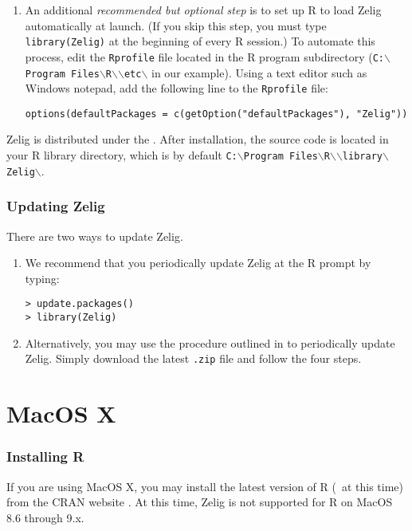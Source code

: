 \begin{enumerate}
\item An additional \emph{recommended but optional step} is to set up
  R to load Zelig automatically at launch.  (If you skip this step,
  you must type {\tt library(Zelig)} at the beginning of every R
  session.)  To automate this process, edit the {\tt Rprofile} file
  located in the R program subdirectory ({\tt C:$\backslash$Program
    Files$\backslash$R$\backslash$\rwvers$\backslash$etc$\backslash$}
  in our example).  Using a text editor such as Windows notepad, add
  the following line to the {\tt Rprofile} file:
\begin{verbatim}
options(defaultPackages = c(getOption("defaultPackages"), "Zelig"))
\end{verbatim}
\end{enumerate}

Zelig is distributed under the .  After
installation, the source code is located in your R library directory,
which is by default {\tt C:$\backslash$Program
  Files$\backslash$R$\backslash$\rwvers$\backslash$library$\backslash$Zelig$\backslash$}.

\subsubsection{Updating Zelig}

There are two ways to update Zelig.
\begin{enumerate}
\item We recommend that you periodically update Zelig at the R prompt
  by typing:
\begin{verbatim}
> update.packages()
> library(Zelig)
\end{verbatim}
\item Alternatively, you may use the procedure outlined in
   to periodically update Zelig.  Simply download the
  latest {\tt .zip} file and follow the four steps.
\end{enumerate}

\section{MacOS X}\label{ss:osx}

\subsubsection{Installing R}  

If you are using MacOS X, you may install the latest version of R
(\fullrvers\ at this time) from the CRAN website .
At this time, Zelig is not supported for R on MacOS 8.6 through 9.x.

